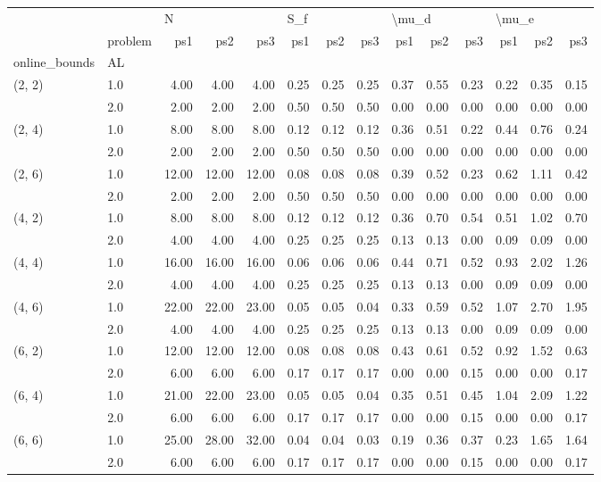 \begin{tabular}{llrrrrrrrrrrrr}
\toprule
       & {} & \multicolumn{3}{l}{N} & \multicolumn{3}{l}{S\_f} & \multicolumn{3}{l}{\textbackslash mu\_d} & \multicolumn{3}{l}{\textbackslash mu\_e} \\
       & problem &   ps1 &   ps2 &   ps3 &  ps1 &  ps2 &  ps3 &   ps1 &  ps2 &  ps3 &   ps1 &  ps2 &  ps3 \\
online\_bounds & AL &       &       &       &      &      &      &       &      &      &       &      &      \\
\midrule
(2, 2) & 1.0 &  4.00 &  4.00 &  4.00 & 0.25 & 0.25 & 0.25 &  0.37 & 0.55 & 0.23 &  0.22 & 0.35 & 0.15 \\
       & 2.0 &  2.00 &  2.00 &  2.00 & 0.50 & 0.50 & 0.50 &  0.00 & 0.00 & 0.00 &  0.00 & 0.00 & 0.00 \\
(2, 4) & 1.0 &  8.00 &  8.00 &  8.00 & 0.12 & 0.12 & 0.12 &  0.36 & 0.51 & 0.22 &  0.44 & 0.76 & 0.24 \\
       & 2.0 &  2.00 &  2.00 &  2.00 & 0.50 & 0.50 & 0.50 &  0.00 & 0.00 & 0.00 &  0.00 & 0.00 & 0.00 \\
(2, 6) & 1.0 & 12.00 & 12.00 & 12.00 & 0.08 & 0.08 & 0.08 &  0.39 & 0.52 & 0.23 &  0.62 & 1.11 & 0.42 \\
       & 2.0 &  2.00 &  2.00 &  2.00 & 0.50 & 0.50 & 0.50 &  0.00 & 0.00 & 0.00 &  0.00 & 0.00 & 0.00 \\
(4, 2) & 1.0 &  8.00 &  8.00 &  8.00 & 0.12 & 0.12 & 0.12 &  0.36 & 0.70 & 0.54 &  0.51 & 1.02 & 0.70 \\
       & 2.0 &  4.00 &  4.00 &  4.00 & 0.25 & 0.25 & 0.25 &  0.13 & 0.13 & 0.00 &  0.09 & 0.09 & 0.00 \\
(4, 4) & 1.0 & 16.00 & 16.00 & 16.00 & 0.06 & 0.06 & 0.06 &  0.44 & 0.71 & 0.52 &  0.93 & 2.02 & 1.26 \\
       & 2.0 &  4.00 &  4.00 &  4.00 & 0.25 & 0.25 & 0.25 &  0.13 & 0.13 & 0.00 &  0.09 & 0.09 & 0.00 \\
(4, 6) & 1.0 & 22.00 & 22.00 & 23.00 & 0.05 & 0.05 & 0.04 &  0.33 & 0.59 & 0.52 &  1.07 & 2.70 & 1.95 \\
       & 2.0 &  4.00 &  4.00 &  4.00 & 0.25 & 0.25 & 0.25 &  0.13 & 0.13 & 0.00 &  0.09 & 0.09 & 0.00 \\
(6, 2) & 1.0 & 12.00 & 12.00 & 12.00 & 0.08 & 0.08 & 0.08 &  0.43 & 0.61 & 0.52 &  0.92 & 1.52 & 0.63 \\
       & 2.0 &  6.00 &  6.00 &  6.00 & 0.17 & 0.17 & 0.17 &  0.00 & 0.00 & 0.15 &  0.00 & 0.00 & 0.17 \\
(6, 4) & 1.0 & 21.00 & 22.00 & 23.00 & 0.05 & 0.05 & 0.04 &  0.35 & 0.51 & 0.45 &  1.04 & 2.09 & 1.22 \\
       & 2.0 &  6.00 &  6.00 &  6.00 & 0.17 & 0.17 & 0.17 &  0.00 & 0.00 & 0.15 &  0.00 & 0.00 & 0.17 \\
(6, 6) & 1.0 & 25.00 & 28.00 & 32.00 & 0.04 & 0.04 & 0.03 &  0.19 & 0.36 & 0.37 &  0.23 & 1.65 & 1.64 \\
       & 2.0 &  6.00 &  6.00 &  6.00 & 0.17 & 0.17 & 0.17 &  0.00 & 0.00 & 0.15 &  0.00 & 0.00 & 0.17 \\
\bottomrule
\end{tabular}
